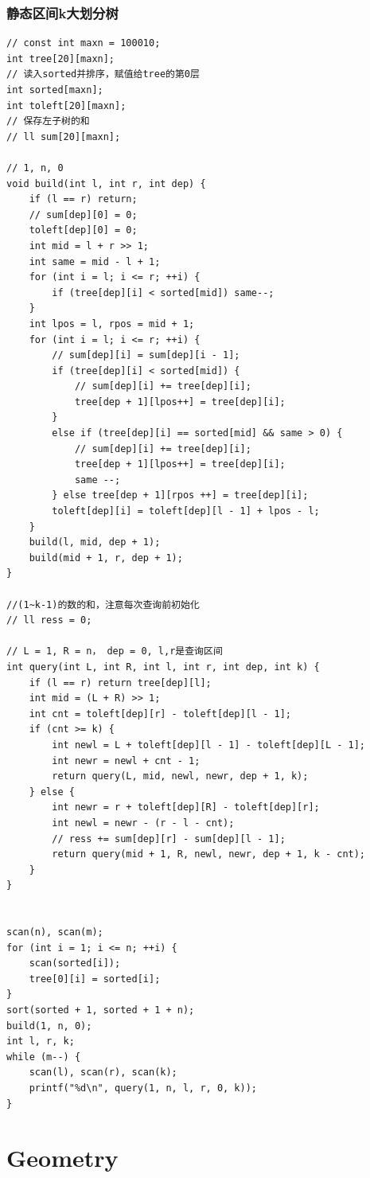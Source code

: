 \documentclass[twoside]{article}
\begin{document}
\subsubsection{静态区间k大划分树}
\begin{lstlisting}
// const int maxn = 100010;
int tree[20][maxn];
// 读入sorted并排序，赋值给tree的第0层
int sorted[maxn];
int toleft[20][maxn];
// 保存左子树的和
// ll sum[20][maxn];

// 1, n, 0
void build(int l, int r, int dep) {
    if (l == r) return;
    // sum[dep][0] = 0;
    toleft[dep][0] = 0;
    int mid = l + r >> 1;
    int same = mid - l + 1;
    for (int i = l; i <= r; ++i) {
        if (tree[dep][i] < sorted[mid]) same--;
    }
    int lpos = l, rpos = mid + 1;
    for (int i = l; i <= r; ++i) {
        // sum[dep][i] = sum[dep][i - 1];
        if (tree[dep][i] < sorted[mid]) {
            // sum[dep][i] += tree[dep][i];
            tree[dep + 1][lpos++] = tree[dep][i];
        }
        else if (tree[dep][i] == sorted[mid] && same > 0) {
            // sum[dep][i] += tree[dep][i];
            tree[dep + 1][lpos++] = tree[dep][i];
            same --;
        } else tree[dep + 1][rpos ++] = tree[dep][i];
        toleft[dep][i] = toleft[dep][l - 1] + lpos - l;
    }
    build(l, mid, dep + 1);
    build(mid + 1, r, dep + 1);
}

//(1~k-1)的数的和，注意每次查询前初始化
// ll ress = 0;

// L = 1, R = n， dep = 0, l,r是查询区间
int query(int L, int R, int l, int r, int dep, int k) {
    if (l == r) return tree[dep][l];
    int mid = (L + R) >> 1;
    int cnt = toleft[dep][r] - toleft[dep][l - 1];
    if (cnt >= k) {
        int newl = L + toleft[dep][l - 1] - toleft[dep][L - 1];
        int newr = newl + cnt - 1;
        return query(L, mid, newl, newr, dep + 1, k);
    } else {
        int newr = r + toleft[dep][R] - toleft[dep][r];
        int newl = newr - (r - l - cnt);
        // ress += sum[dep][r] - sum[dep][l - 1];
        return query(mid + 1, R, newl, newr, dep + 1, k - cnt);
    }
}


scan(n), scan(m);
for (int i = 1; i <= n; ++i) {
    scan(sorted[i]);
    tree[0][i] = sorted[i];
}
sort(sorted + 1, sorted + 1 + n);
build(1, n, 0);
int l, r, k;
while (m--) {
    scan(l), scan(r), scan(k);
    printf("%d\n", query(1, n, l, r, 0, k));
}\end{lstlisting}
\clearpage\section{Geometry}
\end{document}
